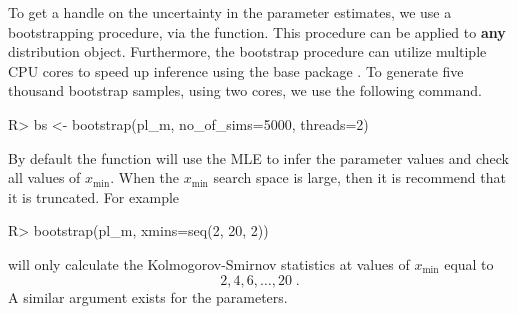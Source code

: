 \documentclass[article]{jss}
\newcommand{\xmin}{x_{\min}}
\begin{document}
To get a handle on the uncertainty in the parameter estimates, we use a
bootstrapping procedure, via the  function. This procedure can
be applied to \textbf{any} distribution object. Furthermore, the bootstrap
procedure can utilize multiple CPU cores to speed up inference using the base
package . To generate five thousand bootstrap samples, using two
cores, we use the following command.
\begin{Schunk}
\begin{Sinput}
R> bs <- bootstrap(pl_m, no_of_sims=5000, threads=2)
\end{Sinput}
\end{Schunk}
By default the  function will use the MLE to infer the
parameter values and check all values of $\xmin$. When the $\xmin$
search space is large, then it is recommend that it is truncated.  For
example
\begin{Schunk}
\begin{Sinput}
R> bootstrap(pl_m, xmins=seq(2, 20, 2))
\end{Sinput}
\end{Schunk}
will only calculate the Kolmogorov-Smirnov statistics at values of $\xmin$ equal to
\[
2, 4, 6, \ldots, 20\;.
\]
A similar argument exists for the parameters.
\end{document}
